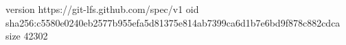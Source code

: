 version https://git-lfs.github.com/spec/v1
oid sha256:c5580e0240eb2577b955efa5d81375e814ab7399ca6d1b7e6bd9f878c882cdca
size 42302
